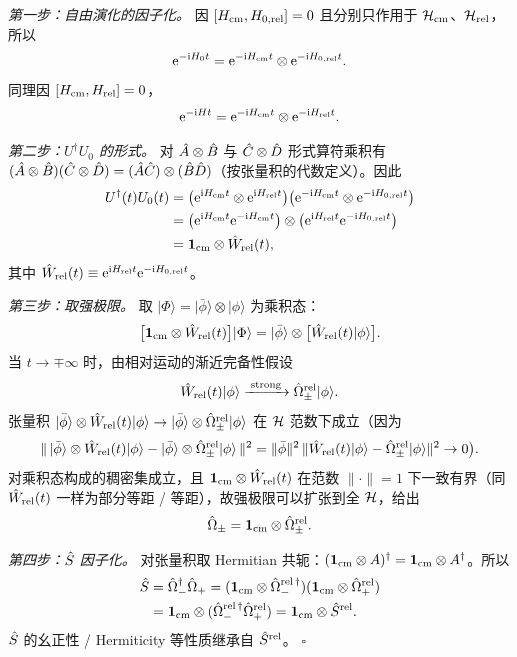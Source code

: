 \begin{proof*}
\textit{第一步：自由演化的因子化。} 因 $[H_{\rm cm},H_{0,\rm rel}]=0$ 且分别只作用于 $\mathcal{H}_{\rm cm}$、$\mathcal{H}_{\rm rel}$，所以
\[
  \mathrm{e}^{-\mathrm{i} H_0 t} = \mathrm{e}^{-\mathrm{i} H_{\rm cm}t}\otimes \mathrm{e}^{-\mathrm{i} H_{0,\rm rel}t}.
\]
同理因 $[H_{\rm cm},H_{\rm rel}]=0$，
\[
  \mathrm{e}^{-\mathrm{i} H t} = \mathrm{e}^{-\mathrm{i} H_{\rm cm}t}\otimes \mathrm{e}^{-\mathrm{i} H_{\rm rel}t}.
\]

\textit{第二步：$U^\dagger U_0$ 的形式。} 对 $\hat{A}\otimes\hat{B}$ 与 $\hat{C}\otimes\hat{D}$ 形式算符乘积有 $(\hat{A}\otimes\hat{B})(\hat{C}\otimes\hat{D})=(\hat{A}\hat{C})\otimes(\hat{B}\hat{D})$（按张量积的代数定义）。因此
\begin{align*}
  U^\dagger(t) U_0(t)
  &= \big(\mathrm{e}^{\mathrm{i} H_{\rm cm}t}\otimes \mathrm{e}^{\mathrm{i} H_{\rm rel}t}\big)
     \big(\mathrm{e}^{-\mathrm{i} H_{\rm cm}t}\otimes \mathrm{e}^{-\mathrm{i} H_{0,\rm rel}t}\big) \\
  &= \big(\mathrm{e}^{\mathrm{i} H_{\rm cm}t}\mathrm{e}^{-\mathrm{i} H_{\rm cm}t}\big)\otimes
     \big(\mathrm{e}^{\mathrm{i} H_{\rm rel}t}\mathrm{e}^{-\mathrm{i} H_{0,\rm rel}t}\big) \\
  &= \mathbf{1}_{\rm cm}\otimes \hat{W}_{\rm rel}(t),
\end{align*}
其中 $\hat{W}_{\rm rel}(t)\equiv\mathrm{e}^{\mathrm{i} H_{\rm rel}t}\mathrm{e}^{-\mathrm{i} H_{0,\rm rel}t}$。

\textit{第三步：取强极限。} 取 $|\Phi\rangle = |\bar\phi\rangle\otimes|\phi\rangle$ 为乘积态：
\[
  \big[\mathbf{1}_{\rm cm}\otimes \hat{W}_{\rm rel}(t)\big]|\Phi\rangle
  = |\bar\phi\rangle \otimes \big[\hat{W}_{\rm rel}(t)|\phi\rangle\big].
\]
当 $t\to\mp\infty$ 时，由相对运动的渐近完备性假设
\[
  \hat{W}_{\rm rel}(t)|\phi\rangle \xrightarrow{\;\text{strong}\;} \hat{\Omega}_{\pm}^{\rm rel}|\phi\rangle.
\]
张量积 $|\bar\phi\rangle\otimes\hat{W}_{\rm rel}(t)|\phi\rangle \to |\bar\phi\rangle\otimes\hat{\Omega}_{\pm}^{\rm rel}|\phi\rangle$ 在 $\mathcal{H}$ 范数下成立（因为
\[
  \|\,|\bar\phi\rangle\otimes\hat{W}_{\rm rel}(t)|\phi\rangle - |\bar\phi\rangle\otimes\hat{\Omega}_{\pm}^{\rm rel}|\phi\rangle\,\|^2
  = \|\bar\phi\|^2\,\|\hat{W}_{\rm rel}(t)|\phi\rangle - \hat{\Omega}_{\pm}^{\rm rel}|\phi\rangle\|^2 \to 0\big).
\]
对乘积态构成的稠密集成立，且 $\mathbf{1}_{\rm cm}\otimes\hat{W}_{\rm rel}(t)$ 在范数 $\|\cdot\|=1$ 下一致有界（同 $\hat{W}_{\rm rel}(t)$ 一样为部分等距 / 等距），故强极限可以扩张到全 $\mathcal{H}$，给出
\[
  \hat{\Omega}_{\pm} = \mathbf{1}_{\rm cm}\otimes\hat{\Omega}_{\pm}^{\rm rel}.
\]

\textit{第四步：$\hat{S}$ 因子化。} 对张量积取 Hermitian 共轭：$(\mathbf{1}_{\rm cm}\otimes A)^\dagger=\mathbf{1}_{\rm cm}\otimes A^\dagger$。所以
\begin{align*}
  \hat{S} &= \hat{\Omega}_{-}^\dagger \hat{\Omega}_{+}
   = (\mathbf{1}_{\rm cm}\otimes\hat{\Omega}_{-}^{\rm rel\,\dagger})
     (\mathbf{1}_{\rm cm}\otimes\hat{\Omega}_{+}^{\rm rel}) \\
   &= \mathbf{1}_{\rm cm}\otimes(\hat{\Omega}_{-}^{\rm rel\,\dagger}\hat{\Omega}_{+}^{\rm rel})
   = \mathbf{1}_{\rm cm}\otimes \hat{S}^{\rm rel}.
\end{align*}
$\hat{S}$ 的幺正性 / Hermiticity 等性质继承自 $\hat{S}^{\rm rel}$。 $\square$
\end{proof*}

